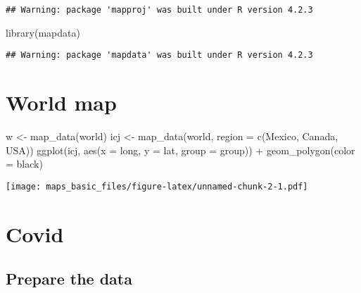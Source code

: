 \documentclass[
]{article}
\newenvironment{Shaded}{\begin{snugshade}}{\end{snugshade}}
\newcommand{\AttributeTok}[1]{\textcolor[rgb]{0.77,0.63,0.00}{#1}}
\newcommand{\FunctionTok}[1]{\textcolor[rgb]{0.00,0.00,0.00}{#1}}
\newcommand{\NormalTok}[1]{#1}
\newcommand{\OtherTok}[1]{\textcolor[rgb]{0.56,0.35,0.01}{#1}}
\newcommand{\SpecialCharTok}[1]{\textcolor[rgb]{0.00,0.00,0.00}{#1}}
\newcommand{\StringTok}[1]{\textcolor[rgb]{0.31,0.60,0.02}{#1}}
\begin{document}
\begin{verbatim}
## Warning: package 'mapproj' was built under R version 4.2.3
\end{verbatim}

\begin{Shaded}
\begin{Highlighting}[]
\FunctionTok{library}\NormalTok{(mapdata)}
\end{Highlighting}
\end{Shaded}

\begin{verbatim}
## Warning: package 'mapdata' was built under R version 4.2.3
\end{verbatim}

\hypertarget{world-map}{%
\section{World map}\label{world-map}}

\begin{Shaded}
\begin{Highlighting}[]
\NormalTok{w }\OtherTok{\textless{}{-}} \FunctionTok{map\_data}\NormalTok{(}\StringTok{\textquotesingle{}world\textquotesingle{}}\NormalTok{)}
\NormalTok{icj }\OtherTok{\textless{}{-}} \FunctionTok{map\_data}\NormalTok{(}\StringTok{\textquotesingle{}world\textquotesingle{}}\NormalTok{,}
                \AttributeTok{region =} \FunctionTok{c}\NormalTok{(}\StringTok{\textquotesingle{}Mexico\textquotesingle{}}\NormalTok{, }\StringTok{\textquotesingle{}Canada\textquotesingle{}}\NormalTok{, }\StringTok{\textquotesingle{}USA\textquotesingle{}}\NormalTok{))}
\FunctionTok{ggplot}\NormalTok{(icj, }\FunctionTok{aes}\NormalTok{(}\AttributeTok{x =}\NormalTok{ long, }\AttributeTok{y =}\NormalTok{ lat, }\AttributeTok{group =}\NormalTok{ group)) }\SpecialCharTok{+}
  \FunctionTok{geom\_polygon}\NormalTok{(}\AttributeTok{color =} \StringTok{\textquotesingle{}black\textquotesingle{}}\NormalTok{) }
\end{Highlighting}
\end{Shaded}

\texttt{[image: maps\_basic\_files/figure-latex/unnamed-chunk-2-1.pdf]}

\hypertarget{covid}{%
\section{Covid}\label{covid}}

\hypertarget{prepare-the-data}{%
\subsection{Prepare the data}\label{prepare-the-data}}
\end{document}
